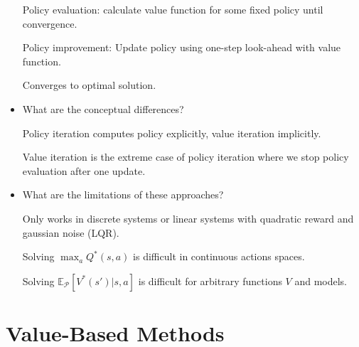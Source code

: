\documentclass[11pt]{scrartcl}
\begin{document}
\begin{itemize}
    Policy evaluation: calculate value function for some fixed policy until convergence.

    Policy improvement: Update policy using one-step look-ahead with value function.

    Converges to optimal solution.

    \item What are the conceptual differences?
    
    Policy iteration computes policy explicitly, value iteration implicitly.

    Value iteration is the extreme case of policy iteration where we stop policy evaluation after
    one update.

    \item What are the limitations of these approaches?
    
    Only works in discrete systems or linear systems with quadratic reward and gaussian noise (LQR).

    Solving $\max_a Q^*(s,a)$ is difficult in continuous actions spaces.

    Solving $\mathbb{E}_\mathcal{P}[V^*(s')|s,a]$ is difficult for arbitrary functions $V$ and models.
\end{itemize}


\section{Value-Based Methods}
\end{document}
